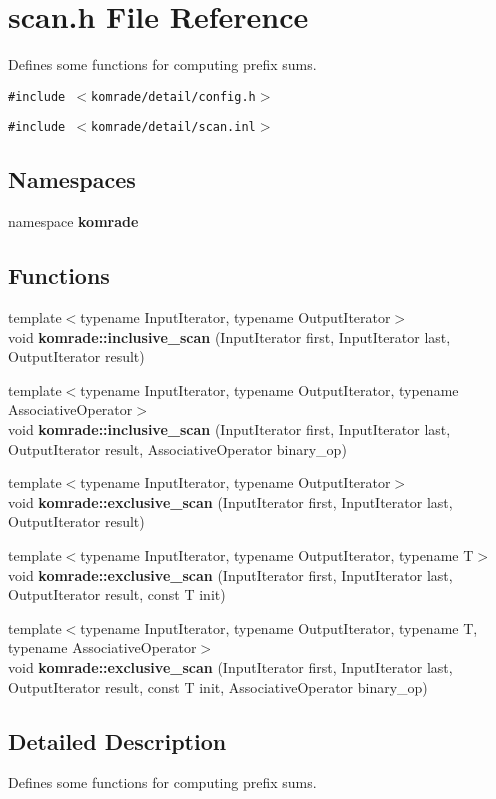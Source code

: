 \section{scan.h File Reference}
\label{scan_8h}
Defines some functions for computing prefix sums. 

{\tt \#include $<$komrade/detail/config.h$>$}\par
{\tt \#include $<$komrade/detail/scan.inl$>$}\par
\subsection*{Namespaces}
\begin{CompactItemize}
\item 
namespace {\bf komrade}
\end{CompactItemize}
\subsection*{Functions}
\begin{CompactItemize}
\item 
{\footnotesize template$<$typename InputIterator, typename OutputIterator$>$ }\\void {\bf komrade::inclusive\_\-scan} (InputIterator first, InputIterator last, OutputIterator result)
\item 
{\footnotesize template$<$typename InputIterator, typename OutputIterator, typename AssociativeOperator$>$ }\\void {\bf komrade::inclusive\_\-scan} (InputIterator first, InputIterator last, OutputIterator result, AssociativeOperator binary\_\-op)
\item 
{\footnotesize template$<$typename InputIterator, typename OutputIterator$>$ }\\void {\bf komrade::exclusive\_\-scan} (InputIterator first, InputIterator last, OutputIterator result)
\item 
{\footnotesize template$<$typename InputIterator, typename OutputIterator, typename T$>$ }\\void {\bf komrade::exclusive\_\-scan} (InputIterator first, InputIterator last, OutputIterator result, const T init)
\item 
{\footnotesize template$<$typename InputIterator, typename OutputIterator, typename T, typename AssociativeOperator$>$ }\\void {\bf komrade::exclusive\_\-scan} (InputIterator first, InputIterator last, OutputIterator result, const T init, AssociativeOperator binary\_\-op)
\end{CompactItemize}


\subsection{Detailed Description}
Defines some functions for computing prefix sums. 


